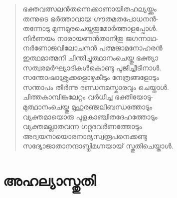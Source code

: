 \begin{verse}
ഭക്തവത്സലന്‍തന്നെക്കാണായിതഹല്യയ്ക്കും\\
തന്നുടെ ഭര്‍ത്താവായ ഗൗതമതപോധനന്‍-\\
തന്നോടു മുന്നമുരചെയ്തതുമോര്‍ത്താളപ്പോള്‍.\\
നിര്‍ണയം നാരായണന്‍താനിതു ജഗന്നാഥ-\\
നര്‍ണോജവിലോചനന്‍ പത്മജാമനോഹരന്‍\\
ഇത്ഥമാത്മനി ചിന്തിച്ചുത്ഥാനംചെയ്തു ഭക്ത്യാ\\
സത്വരമര്‍ഘ്യാദികള്‍കൊണ്ടു പൂജിച്ചീടിനാള്‍.\\
സന്തോഷാശ്രുക്കളൊഴുകീടും നേത്രങ്ങളോടും\\
സന്താപം തീര്‍ന്നു ദണ്ഡനമസ്കാരവും ചെയ്താള്‍.\\
ചിത്തകാമ്പിങ്കലേറ്റം വര്‍ധിച്ച ഭക്തിയോടു-\\
മുത്ഥാനംചെയ്തു മുഹുരഞ്ജലിബന്ധത്തോടും\\
വ്യക്തമായൊരു പുളകാഞ്ചിതദേഹത്തോടും\\
വ്യക്തമല്ലാതവന്ന ഗദ്ഗദവര്‍ണത്തോടും\\
അദ്വയനായൊരനാദ്യസ്വരൂപനെക്കണ്ടു\\
സദ്യോജാതാനന്ദാബ്ധിമഗ്നയായ് സ്തുതിചെയ്താള്‍.
\end{verse}


\section{അഹല്യാസ്തുതി}

